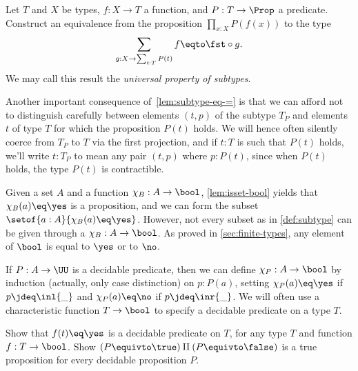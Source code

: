 \begin{xca}\label{xca:subtype-univ-prop}
  Let $T$ and $X$ be types, $f: X\to T$ a function,
  and $P : T\to\Prop$ a predicate.
  Construct an equivalence from the proposition
  $\prod_{x:X} P(f(x))$ to the type
  \begin{displaymath}
    \sum_{g: X \to \sum_{t:T} P(t)} f \eqto \fst\circ g.
  \end{displaymath}
  We may call this result the \emph{universal property of subtypes}.
\end{xca}


\begin{remark}\label{rem:subtype-convention}
  Another important consequence of~\cref{lem:subtype-eq-=}
  is that we can afford not to distinguish carefully
  between elements $(t,p)$ of the subtype $T_P$
  and elements $t$ of type $T$ for which the proposition $P(t)$ holds.
  We will hence often silently coerce from $T_P$ to $T$ via the first projection,
  and if $t:T$ is such that $P(t)$ holds, we'll write $t:T_P$
  to mean any pair $(t,p)$ where $p:P(t)$,
  since when $P(t)$ holds, the type $P(t)$ is contractible.
\end{remark}
Given a set $A$ and a function $\chi_B: A\to\bool$,
\cref{lem:isset-bool} yields that $\chi_B(a) \eq \yes$ is a
proposition, and we can form
the subset $\setof{a:A}{\chi_B(a) \eq \yes}$. However,
not every subset as in \cref{def:subtype} can be given
through a $\chi_B: A\to\bool$. As proved in \cref{sec:finite-types},
any element of $\bool$ is equal to $\yes$ or to $\no$.

If $P: A\to\UU$ is a decidable predicate, then
we can define $\chi_P: A\to\bool$ by induction (actually,
only case distinction) on $p:P(a)$, setting $\chi_P(a) \eq \yes$
if $p\jdeq\inl{\_}$ and $\chi_P(a) \eq \no$ if $p\jdeq\inr{\_}$.
We will often use a characteristic function $T\to\bool$ to
specify a decidable predicate on a type $T$.

\begin{xca}\label{xca:decidability}
Show that $f(t) \eq \yes$ is a decidable predicate on $T$,
for any type $T$ and function $f:T\to\bool$.
Show $(P\equivto\true)\amalg(P\equivto\false)$ is a true proposition
for every decidable proposition $P$.
\end{xca}

